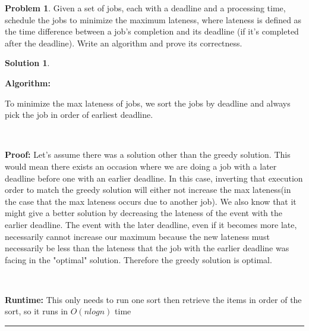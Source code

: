 \documentclass{article}
\theoremstyle{definition}
\newtheorem{problem}{Problem}
\def\fline{\rule{0.75\linewidth}{0.5pt}}
\newcommand{\finishline}{\begin{center}\fline\end{center}}
\newtheorem*{solution*}{Solution}
\newenvironment{solution}{\begin{solution*}}{{\finishline} \end{solution*}}
\begin{document}
\newpage




\begin{problem}
    Given a set of jobs, each with a deadline and a processing time, schedule the jobs to minimize the maximum lateness, where lateness is defined as the time difference between a job’s completion and its deadline (if it’s completed after the deadline). Write an algorithm and prove its correctness.
\end{problem}






\begin{solution}

    \

    \textbf{Algorithm: }
    \

    To minimize the max lateness of jobs, we sort the jobs by deadline and always pick the job in order of earliest deadline. 



    \

    \textbf{Proof: }
        Let's assume there was a solution other than the greedy solution. This would mean there exists an occasion where we are doing a job with a later deadline before one with an earlier deadline. In this case, inverting that execution order to match the greedy solution will either not increase the max lateness(in the case that the max lateness occurs due to another job). We also know that it might give a better solution by decreasing the lateness of the event with the earlier deadline. The event with the later deadline, even if it becomes more late, necessarily cannot increase our maximum because the new lateness must necessarily be less than the lateness that the job with the earlier deadline was facing in the "optimal" solution. Therefore the greedy solution is optimal.





    \


    \textbf{Runtime: }
    This only needs to run one sort then retrieve the items in order of the sort, so it runs in $O(nlogn)$ time


\end{solution}
\end{document}
